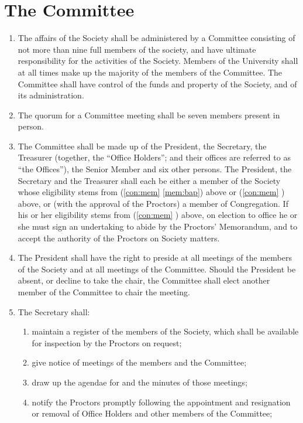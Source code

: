 \documentclass[11pt]{article}
\begin{document}
\section{The Committee}\label{con:str}\label{con:mee}
\begin{enumerate}
\item The affairs of the Society shall be administered by a Committee consisting of not more than nine full members of the society, and have ultimate responsibility for the activities of the Society. Members of the University shall at all times make up the majority of the members of the Committee. The Committee shall have control of the funds and property of the Society, and of its administration.
\item The quorum for a Committee meeting shall be seven members present in person. 
\item The Committee shall be made up of the President, the Secretary, the Treasurer (together, the ``Office Holders''; and their offices are referred to as ``the Offices''), the Senior Member and six other persons. The President, the Secretary and the Treasurer shall each be either a member of the Society whose eligibility stems from  (\cref{con:mem} \cref{mem:bap}) above or  (\cref{con:mem} ) above, or (with the approval of the Proctors) a member of Congregation. If his or her eligibility stems from  (\cref{con:mem} ) above, on election to office he or she must sign an undertaking to abide by the Proctors' Memorandum, and to accept the authority of the Proctors on Society matters.
\item The President shall have the right to preside at all meetings of the members of the Society and at all meetings of the Committee. Should the President be absent, or decline to take the chair, the Committee shall elect another member of the Committee to chair the meeting.
\item \label{com:sec} The Secretary shall:
\begin{enumerate}
\item maintain a register of the members of the Society, which shall be available for inspection by the Proctors on request;
\item give notice of meetings of the members and the Committee;
\item draw up the agendae for and the minutes of those meetings;
\item notify the Proctors promptly following the appointment and resignation or removal of Office Holders and other members of the Committee;

\end{enumerate}
\end{enumerate}
\end{document}
